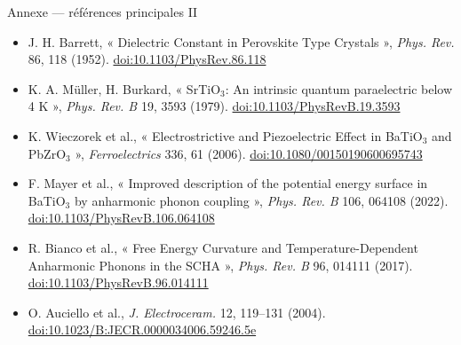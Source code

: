 \documentclass[aspectratio=169,10pt,t]{beamer}
\begin{document}
\begin{frame}{Annexe --- références principales II}
  \small
  \begin{itemize}\setlength\itemsep{0.19cm}
    \item J. H. Barrett, « Dielectric Constant in Perovskite Type Crystals », \textit{Phys. Rev.} 86, 118 (1952). \href{https://doi.org/10.1103/PhysRev.86.118}{doi:10.1103/PhysRev.86.118}
    \item K. A. Müller, H. Burkard, « SrTiO$_3$: An intrinsic quantum paraelectric below 4 K », \textit{Phys. Rev. B} 19, 3593 (1979). \href{https://doi.org/10.1103/PhysRevB.19.3593}{doi:10.1103/PhysRevB.19.3593}
    \item K. Wieczorek et al., « Electrostrictive and Piezoelectric Effect in BaTiO$_3$ and PbZrO$_3$ », \textit{Ferroelectrics} 336, 61 (2006). \href{https://doi.org/10.1080/00150190600695743}{doi:10.1080/00150190600695743}
    \item F. Mayer et al., « Improved description of the potential energy surface in BaTiO$_3$ by anharmonic phonon coupling », \textit{Phys. Rev. B} 106, 064108 (2022). \href{https://doi.org/10.1103/PhysRevB.106.064108}{doi:10.1103/PhysRevB.106.064108}
    \item R. Bianco et al., « Free Energy Curvature and Temperature-Dependent Anharmonic Phonons in the SCHA », \textit{Phys. Rev. B} 96, 014111 (2017). \href{https://doi.org/10.1103/PhysRevB.96.014111}{doi:10.1103/PhysRevB.96.014111}
    \item O. Auciello et al., \textit{J. Electroceram.} 12, 119--131 (2004). \href{https://doi.org/10.1023/B:JECR.0000034006.59246.5e}{doi:10.1023/B:JECR.0000034006.59246.5e}
  \end{itemize}
\end{frame}
\end{document}

